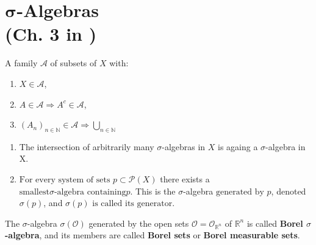 \section{\(\boldsymbol{\sigma}\)-Algebras \protect\\ (Ch. 3 in \cite{schilling2017measures})}
\begin{definition}
    A family \(\mathscr{A}\) of subsets of \(X\) with:
    \begin{enumerate}[label=(\roman*)]
        \item \(X\in\mathscr{A}\), \label{ax:sigma1}
        \item \(A\in\mathscr{A} \Rightarrow A^c \in\mathscr{A}\), \label{ax:sigma2}
        \item \(\left( A_n \right)_{n\in\mathbb{N}} \in\mathscr{A} \Rightarrow \bigcup\limits_{n\in\mathbb{N}} \)
    \end{enumerate}
\end{definition}
\begin{theorem}
    \quad 

    \begin{enumerate}[label=(\roman*)]
        \item The intersection of arbitrarily many \(\sigma\)-algebras in \(X\) is againg a \(\sigma\)-algebra in X.
        \item \(\text{For every system of sets }p \subset \mathscr{P}(X)\) there exists a 
        \(\text{smallest} \sigma\text{-algebra containing} p. \) This is the \(\sigma\)-algebra
        \(\text{generated by } p\), denoted \(\sigma(p)\), and 
        \(\sigma(p) \text{ is called its generator}\).
    \end{enumerate}
\end{theorem}
\begin{definition}[Borel]
    The \(\sigma\)-algebra \(\sigma(\mathcal{O})\) generated by the open sets \(\mathcal{O} = \mathcal{O}_{\mathbb{R}^n}\) of $\mathbb{R}^n$
    is called \textbf{Borel $\sigma$-algebra}, and its members are called \textbf{Borel sets} or
    \textbf{Borel measurable sets}.
\end{definition}